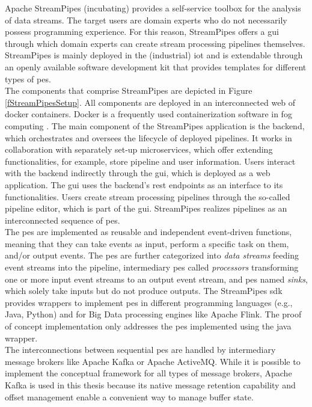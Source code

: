 Apache StreamPipes (incubating) provides a self-service toolbox for the analysis of data streams. The target users are domain experts who do not necessarily possess programming experience. For this reason, StreamPipes offers a \gls{gui} through which domain experts can create stream processing pipelines themselves. StreamPipes is mainly deployed in the (industrial) \gls{iot} and is extendable through an openly available software development kit that provides templates for different types of \gls{pe}s.\\
The components that comprise StreamPipes are depicted in Figure \ref{fStreamPipesSetup}. All components are deployed in an interconnected web of docker containers. Docker is a frequently used containerization software in fog computing \cite{Brogi.2018}. The main component of the StreamPipes application is the backend, which orchestrates and oversees the lifecycle of deployed pipelines. It works in collaboration with separately set-up microservices, which offer extending functionalities, for example, store pipeline and user information. Users interact with the backend indirectly through the \gls{gui}, which is deployed as a web application. The \gls{gui} uses the backend's \gls{rest} endpoints as an interface to its functionalities. Users create stream processing pipelines through the so-called pipeline editor, which is part of the \gls{gui}. StreamPipes realizes pipelines as an interconnected sequence of \gls{pe}s.\\
The \gls{pe}s are implemented as reusable and independent event-driven functions, meaning that they can take events as input, perform a specific task on them, and/or output events. The \gls{pe}s are further categorized into \textit{data streams} feeding event streams into the pipeline, intermediary \gls{pe}s called \textit{processors} transforming one or more input event streams to an output event stream, and \gls{pe}s named \textit{sinks}, which solely take inputs but do not produce outputs. The StreamPipes \gls{sdk} provides wrappers to implement \gls{pe}s in different programming languages (e.g., Java, Python) and for Big Data processing engines like Apache Flink. The proof of concept implementation only addresses the \gls{pe}s implemented using the java wrapper.\\
The interconnections between sequential \gls{pe}s are handled by intermediary message brokers like Apache Kafka or Apache ActiveMQ. While it is possible to implement the conceptual framework for all types of message brokers, Apache Kafka is used in this thesis because its native message retention capability and offset management enable a convenient way to manage buffer state.

